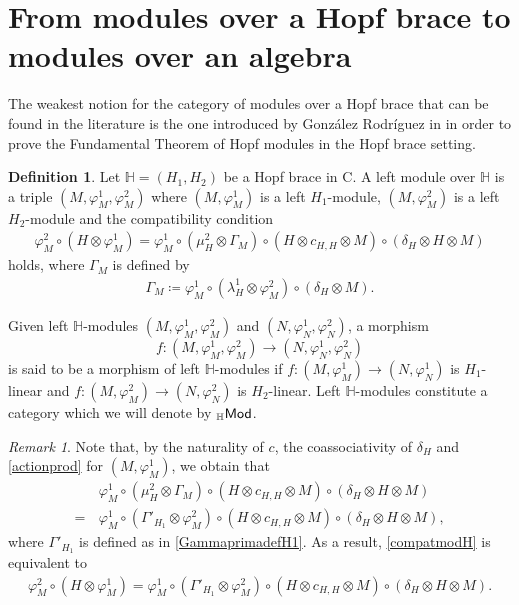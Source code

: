\documentclass[11pt,reqno]{amsart}
\theoremstyle{plain}%
\theoremstyle{definition}
\newtheorem{definition}[theorem]{Definition}%
\theoremstyle{remark}
\newtheorem{remark}[theorem]{Remark}
\begin{document}
\section{From modules over a Hopf brace to modules over an algebra}\label{sec_equivalence}
The weakest notion for the category of modules over a Hopf brace that can be found in the literature is the one introduced by González Rodríguez in \cite{RGON} in order to prove the Fundamental Theorem of Hopf modules in the Hopf brace setting.
\begin{definition}\label{RGONdef}
Let $\mathbb{H}=(H_{1},H_{2})$ be a Hopf brace in {\sf C}. A left module over $\mathbb{H}$ is a triple $(M,\varphi_{M}^{1},\varphi_{M}^{2})$ where $(M,\varphi_{M}^{1})$ is a left $H_{1}$-module, $(M,\varphi_{M}^{2})$ is a left $H_{2}$-module and the compatibility condition 
\begin{gather}\label{compatmodH}
\varphi_{M}^{2}\circ(H\otimes\varphi_{M}^{1})=\varphi_{M}^{1}\circ(\mu_{H}^{2}\otimes\Gamma_{M})\circ(H\otimes c_{H,H}\otimes M)\circ(\delta_{H}\otimes H\otimes M)
\end{gather}
holds, where $\Gamma_{M}$ is defined by 
\begin{gather}\label{GammaMdef}
\Gamma_{M}\coloneqq\varphi_{M}^{1}\circ(\lambda_{H}^{1}\otimes\varphi_{M}^{2})\circ(\delta_{H}\otimes M).
\end{gather}
	
	Given left $\mathbb{H}$-modules  $(M,\varphi_{M}^1, \varphi_{M}^{2})$  and  $(N,\varphi_{N}^1, \varphi_{N}^{2})$, a morphism $$f\colon (M,\varphi_{M}^1, \varphi_{M}^{2})\rightarrow (N,\varphi_{N}^1, \varphi_{N}^{2})$$  is said to be a morphism of left $\mathbb{H}$-modules if  $f\colon (M,\varphi_{M}^{1})\rightarrow(N,\varphi_{N}^{1})$ is $H_{1}$-linear and $f\colon (M,\varphi_{M}^{2})\rightarrow(N,\varphi_{N}^{2})$ is $H_{2}$-linear. Left ${\mathbb H}$-modules constitute a category which we will denote by ${}_{\mathbb{H}}{\sf Mod}$. 
\end{definition}
\begin{remark}
	Note that, by the naturality of $c$, the coassociativity of $\delta_{H}$ and \eqref{actionprod} for $(M,\varphi_{M}^{1})$, we obtain that
	\begin{align*}
		&\varphi_{M}^{1}\circ(\mu_{H}^{2}\otimes\Gamma_{M})\circ(H\otimes c_{H,H}\otimes M)\circ(\delta_{H}\otimes H\otimes M)\\=\,&\varphi_{M}^{1}\circ(\Gamma'_{H_{1}}\otimes\varphi_{M}^{2})\circ(H\otimes c_{H,H}\otimes M)\circ(\delta_{H}\otimes H\otimes M),
	\end{align*}
	where $\Gamma'_{H_{1}}$ is defined as in \eqref{GammaprimadefH1}. As a result, \eqref{compatmodH} is equivalent to
	\begin{gather}\label{compatmodHprime}
		\varphi_{M}^{2}\circ(H\otimes\varphi_{M}^{1})=\varphi_{M}^{1}\circ(\Gamma'_{H_{1}}\otimes\varphi_{M}^{2})\circ(H\otimes c_{H,H}\otimes M)\circ(\delta_{H}\otimes H\otimes M).
	\end{gather}
\end{remark}
\end{document}
